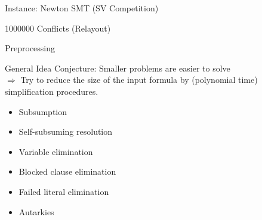 \documentclass[t]{sdqbeamer}
\begin{document}
\begin{frame}{Instance: Newton SMT (SV Competition)}
{\begin{block}{1000000 Conflicts (Relayout)}
        \end{block}
    }
\end{frame}

    
\begin{frame}{Preprocessing}
    \begin{block}{General Idea}
      Conjecture: Smaller problems are easier to solve\\[1em]
      $\Longrightarrow$ Try to reduce the size of the input formula by (polynomial time) simplification procedures.
    \begin{itemize}
      \item Subsumption
      \item Self-subsuming resolution
      \item Variable elimination
      \item Blocked clause elimination
      \item Failed literal elimination
      \item Autarkies
    \end{itemize}
    \end{block}
    \end{frame}
    
\end{document}

